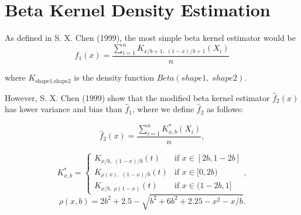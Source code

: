 \documentclass[12pt,twoside]{smiththesis}
\begin{document}
\hypertarget{betakernel}{%
\section{Beta Kernel Density Estimation}\label{betakernel}}

As defined in S. X. Chen (1999), the most simple beta kernel estimator would be
\[\hat f_1(x) = \dfrac{\sum_{i=1}^n K_{x/b + 1, \; (1-x)/b + 1} (X_i)}{n}\]

where \(K_{\text{shape1}, \text{shape2}}\) is the density function \(Beta(shape1, \; shape2)\).

However, S. X. Chen (1999) show that the modified beta kernel estimator \(\hat f_2(x)\) has lower variance and bias than \(\hat f_1\), where we define \(\hat f_2\) as follows:

\[
\hat f_2(x)  = \dfrac{\sum_{i=1}^n K_{x,b}^*(X_i)}{n},\]

\[K^*_{x,b} = \begin{cases}K_{x/b, \; (1-x)/b }(t)  & \text{if }x \in [2b,1-2b] \\
K_{\rho(x), \; (1-x)/b } (t)  & \text{if } x \in [0,2b) \\
K_{x/b, \; \rho(1-x)}(t) & \text{if } x\in(1-2b,1]
\end{cases},
\]
\[\rho(x,b) = 2b^2 + 2.5 - \sqrt{b^2 + 6b^2 +2.25-x^2 -x/b}.\]
\end{document}
